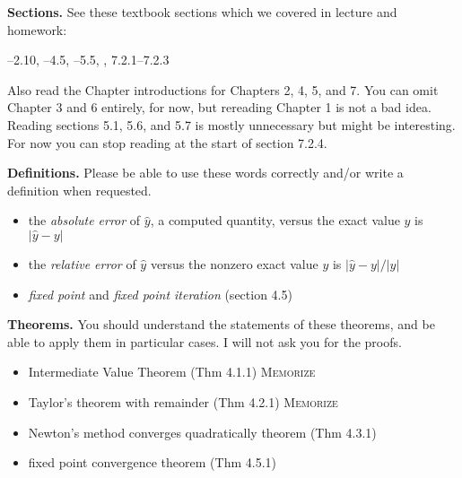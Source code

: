 \documentclass[12pt]{amsart}
\begin{document}
\newcommand{\sgpart}[1]{\bigskip\noindent\large\textbf{#1.} \normalsize}

\sgpart{Sections} See these textbook sections which we covered in lecture and homework:

--2.10, --4.5, --5.5, , 7.2.1--7.2.3

\noindent Also read the Chapter introductions for Chapters 2, 4, 5, and 7.  You can omit Chapter 3 and 6 entirely, for now, but rereading Chapter 1 is not a bad idea.  Reading sections 5.1, 5.6, and 5.7 is mostly unnecessary but might be interesting.  For now you can stop reading at the start of section 7.2.4.

\sgpart{Definitions}  Please be able to use these words correctly and/or write a definition when requested.
  \begin{itemize}
  \item  the \emph{absolute error} of $\hat y$, a computed quantity, versus the exact value $y$ is $|\hat y - y|$
  \item  the \emph{relative error} of $\hat y$ versus the nonzero exact value $y$ is $|\hat y - y|/|y|$  
  \item  \emph{fixed point} and \emph{fixed point iteration}  (section 4.5)
  \end{itemize}
\vfill

\newpage
\sgpart{Theorems}  You should understand the statements of these theorems, and be able to apply them in particular cases.  I will not ask you for the proofs.
  \begin{itemize}
  \item  Intermediate Value Theorem (Thm 4.1.1) \qquad  \textsc{Memorize}
  \item  Taylor's theorem with remainder (Thm 4.2.1) \qquad  \textsc{Memorize}
  \item  Newton's method converges quadratically theorem (Thm 4.3.1)
  \item  fixed point convergence theorem (Thm 4.5.1)
  \end{itemize}
\end{document}
